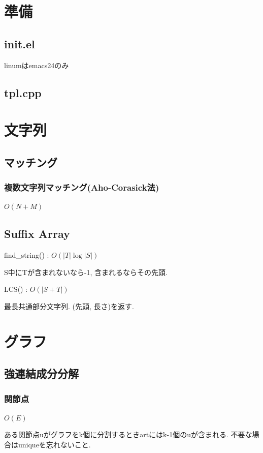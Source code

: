 \documentclass[9pt,twocolumn,a4paper,landscape]{extarticle}
\begin{document}
\tableofcontents
\newpage
%
%
\section{準備}
\subsection{init.el}
linumはemacs24のみ\par


\subsection{tpl.cpp}


\section{文字列}
\subsection{マッチング}
\subsubsection{複数文字列マッチング(Aho-Corasick法)}
$O(N+M)$\par


\subsection{Suffix Array}
find\_string() : $O(|T|\log |S|)$\par
S中にTが含まれないなら-1, 含まれるならその先頭.\par
LCS() : $O(|S+T|)$\par
最長共通部分文字列. (先頭, 長さ)を返す.



\section{グラフ}

\subsection{強連結成分分解}
\subsubsection{関節点}
$O(E)$\par
ある関節点uがグラフをk個に分割するときartにはk-1個のuが含まれる. 不要な場合はuniqueを忘れないこと.\par

\end{document}
